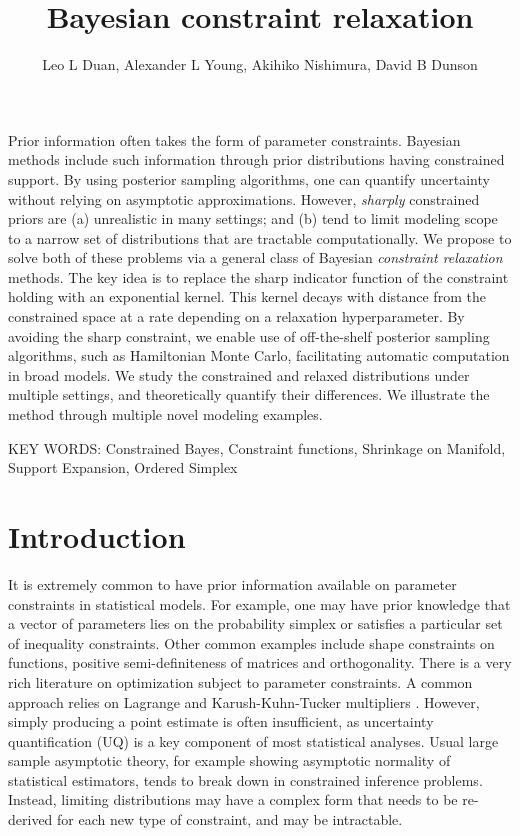 \documentclass[10pt,fleqn]{article}
\title{\textbf{Bayesian constraint relaxation}}
\author{Leo L Duan, Alexander L Young, Akihiko Nishimura, David B Dunson}
\date{}
\DeclareMathOperator{\1}{\mathbbm{1}} \DeclareMathOperator{\bigO}{\mc O}
\begin{document}
\maketitle %

Prior information often takes  the form of parameter constraints. Bayesian
methods include such information through prior distributions having constrained
support. By using posterior sampling algorithms, one can quantify uncertainty
without relying on asymptotic approximations. However, {\em sharply}
constrained priors are (a) unrealistic in many settings; and (b) tend to limit
modeling scope to a narrow set of distributions that are tractable computationally.
We propose to solve both of these problems via a general class of Bayesian 
{\em constraint relaxation} methods.  The key idea is to replace the sharp
indicator function of the constraint holding with an exponential kernel.  This
kernel decays with distance from the constrained space at a rate depending on 
a relaxation hyperparameter.  By avoiding the sharp constraint, we enable use of
off-the-shelf posterior sampling algorithms, such as Hamiltonian Monte Carlo, 
facilitating automatic computation in broad models. We study the constrained and 
relaxed distributions under multiple settings, and theoretically quantify their 
differences. We illustrate the method through multiple novel modeling examples.

\vskip 12pt
        {\noindent KEY WORDS: Constrained Bayes, Constraint
        functions, Shrinkage on Manifold, Support Expansion, Ordered Simplex}
{}

\newpage

\section{Introduction}

It is extremely common to have prior information available on parameter
constraints in statistical models. For example, one may have prior
knowledge that a vector of parameters lies on the probability simplex or
satisfies a particular set of inequality constraints. Other common examples
include shape constraints on functions, positive semi-definiteness of
matrices and orthogonality. There is a very rich literature on optimization
subject to parameter constraints. A common approach relies on Lagrange
and Karush-Kuhn-Tucker multipliers \citep{boyd2004convex}. However, simply
producing a point estimate is often insufficient, as uncertainty
quantification (UQ) is a key component of most statistical analyses. Usual
large sample asymptotic theory, for example showing asymptotic normality of
statistical estimators, tends to break down in constrained inference
problems. Instead, limiting distributions may have a complex form that
needs to be re-derived for each new type of constraint, and may be
intractable.
\end{document}
